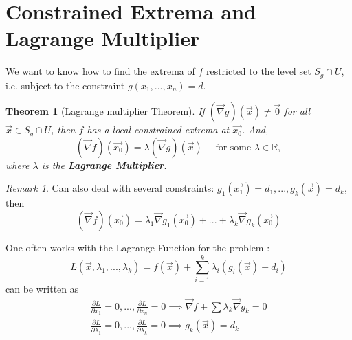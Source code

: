 \documentclass[12pt]{book}
\newtheorem{theorem}{Theorem}[section]
\theoremstyle{definition}
\theoremstyle{remark}
\newtheorem*{remark}{Remark}
\begin{document}
    \section{Constrained Extrema and Lagrange Multiplier}%
      \label{sub:Constrained Extrema and Lagrange Multiplier}
    We want to know how to find the extrema of $f$ restricted to the level set $S_g \cap U$, i.e. subject to the constraint $g(x_1,..., x_n) = d.$     
    \begin{theorem}[Lagrange multiplier Theorem]
      If $(\vec{{\nabla}} g) (\vec{{x}}) \neq \vec{{0}}$ for all $\vec{{x}} \in S_g \cap U$, then $f$ has a local constrained extrema at $\vec{{x_0}}$. And, 
      $$(\vec{{\nabla}} f) (\vec{{x_0}}) = \lambda (\vec{{\nabla}} g) (\vec{{x}}) \quad \text{ for some } \lambda \in \mathbb{R}, $$
      where $\lambda$ is the \textbf{Lagrange Multiplier.} 
    \end{theorem}
    \begin{remark}
      Can also deal with several constraints: $g_1(\vec{{x_1}} ) = d_1, ..., g_k(\vec{{x}}) = d_k$, then 
      $$(\vec{{\nabla }} f) (\vec{{x_0}}) = \lambda_1 \vec{{\nabla}} g_1 (\vec{{x_0}})+ ... +\lambda_k \vec{{\nabla}} g_k (\vec{{x_0}})  $$
    \end{remark}
    One often works with the Lagrange Function for the problem : 
    $$L(\vec{{x}} , \lambda_1 , ..., \lambda_k) = f(\vec{{x}})+ \sum^{k}_{i=1} \lambda_i (g_i(\vec{{x}})-d_i) $$
    can be written as 
    \begin{equation*}
      \begin{split}
        \frac{\partial {L}}{\partial {x_1}} {=0}, ..., \frac{\partial {L}}{\partial {x_n}} =0 \implies \vec{{\nabla }} f + \sum \lambda_k \vec{{\nabla}} g_k = 0\\
        \frac{\partial {L}}{\partial {\lambda_1}} {=0}, ..., \frac{\partial {L}}{\partial {\lambda_k}} =0 \implies g_k(\vec{{x}}) = d_k
      \end{split}
    \end{equation*}
\end{document}
